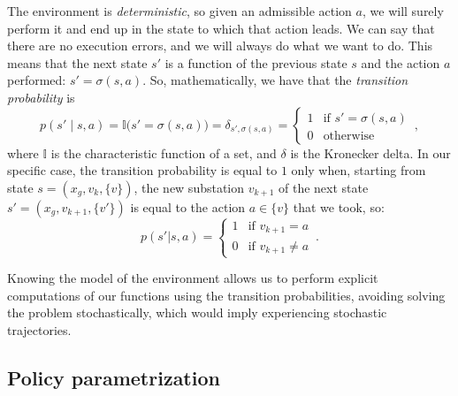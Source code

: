 The environment is \emph{deterministic}, so given an admissible action $a$, we will surely perform it and end up in the state to which that action leads. We can say that there are no execution errors, and we will always do what we want to do. This means that the next state $s'$ is a function of the previous state $s$ and the action $a$ performed: $s' = \sigma(s,a)$. So, mathematically, we have that the \emph{transition probability} is
\begin{equation}
    p(s' \mid s, a) = \mathbb I\big(s' = \sigma(s, a)\big) = \delta_{s', \sigma(s,a)} = \begin{cases} 1 & \text{if } s'=\sigma(s,a) \\ 0 & \text{otherwise} \end{cases} \,,
\end{equation}
where $\mathbb I$ is the characteristic function of a set, and $\delta$ is the Kronecker delta. In our specific case, the transition probability is equal to $1$ only when, starting from state $s = (x_g, v_k, \{v\})$, the new substation $v_{k+1}$ of the next state $s' = (x_g, v_{k+1}, \{v'\})$ is equal to the action $a \in \{v\}$ that we took, so:
\begin{equation}
    p(s' | s,a) = \begin{cases}
        1 & \text{if } v_{k+1} = a \\
        0 & \text{if } v_{k+1} \neq a
    \end{cases} \,.
    \label{eq:transprob}
\end{equation}

Knowing the model of the environment allows us to perform explicit computations of our functions using the transition probabilities, avoiding solving the problem stochastically, which would imply experiencing stochastic trajectories.


\subsection{Policy parametrization}

